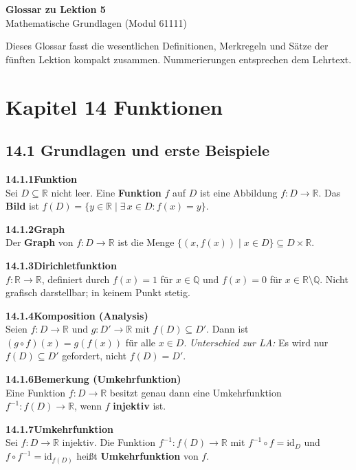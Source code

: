 \documentclass[a4paper,12pt]{article}
\newcommand{\gentry}[3]{%
  \noindent\textbf{#1\quad #2}\nopagebreak\\[0.2em]
  #3\par\smallskip
}
\begin{document}
\begin{center}
  {\LARGE\bfseries Glossar zu Lektion 5}\\[0.5em]
  {\large Mathematische Grundlagen (Modul 61111)}
\end{center}

\vspace{1em}

Dieses Glossar fasst die wesentlichen Definitionen, Merkregeln und Sätze der
fünften Lektion kompakt zusammen. Nummerierungen entsprechen dem Lehrtext.

\section*{Kapitel 14 \quad Funktionen}

\subsection*{14.1 \quad Grundlagen und erste Beispiele}

\gentry{14.1.1}{Funktion}{%
  Sei $D \subseteq \mathbb{R}$ nicht leer. Eine \textbf{Funktion} $f$ auf $D$ ist eine
  Abbildung $f: D \to \mathbb{R}$. Das \textbf{Bild} ist
  $f(D) = \{y \in \mathbb{R} \mid \exists\, x \in D: f(x) = y\}$.
}

\gentry{14.1.2}{Graph}{%
  Der \textbf{Graph} von $f: D \to \mathbb{R}$ ist die Menge
  $\{(x, f(x)) \mid x \in D\} \subseteq D \times \mathbb{R}$.
}

\gentry{14.1.3}{Dirichletfunktion}{%
  $f: \mathbb{R} \to \mathbb{R}$, definiert durch $f(x) = 1$ für $x \in \mathbb{Q}$ und
  $f(x) = 0$ für $x \in \mathbb{R} \setminus \mathbb{Q}$. Nicht grafisch darstellbar;
  in keinem Punkt stetig.
}

\gentry{14.1.4}{Komposition (Analysis)}{%
  Seien $f: D \to \mathbb{R}$ und $g: D' \to \mathbb{R}$ mit $f(D) \subseteq D'$.
  Dann ist $(g \circ f)(x) = g(f(x))$ für alle $x \in D$.
  \textit{Unterschied zur LA:} Es wird nur $f(D) \subseteq D'$ gefordert, nicht
  $f(D) = D'$.
}

\gentry{14.1.6}{Bemerkung (Umkehrfunktion)}{%
  Eine Funktion $f: D \to \mathbb{R}$ besitzt genau dann eine Umkehrfunktion
  $f^{-1}: f(D) \to \mathbb{R}$, wenn $f$ \textbf{injektiv} ist.
}

\gentry{14.1.7}{Umkehrfunktion}{%
  Sei $f: D \to \mathbb{R}$ injektiv. Die Funktion
  $f^{-1}: f(D) \to \mathbb{R}$ mit $f^{-1} \circ f = \mathrm{id}_D$ und
  $f \circ f^{-1} = \mathrm{id}_{f(D)}$ heißt \textbf{Umkehrfunktion} von $f$.
}
\end{document}
